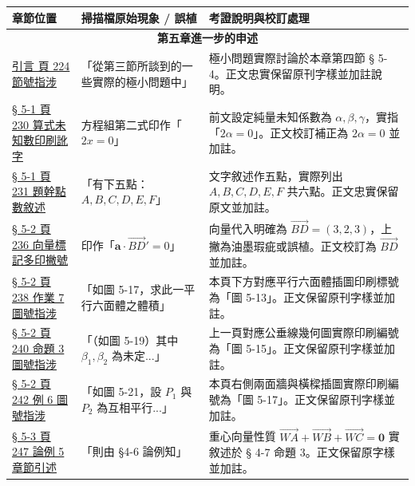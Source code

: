 \documentclass[a4paper,12pt,twoside]{article}
\begin{document}
\begin{table}[H]
\centering
\small
\renewcommand{\arraystretch}{1.35}
\begin{tabularx}{\textwidth}{|p{3.2cm}|p{3.8cm}|X|}
\hline
\textbf{章節位置} & \textbf{掃描檔原始現象 / 誤植} & \textbf{考證說明與校訂處理} \\ \hline

\multicolumn{3}{|c|}{\textbf{第五章\quad 進一步的申述}} \\ \hline

\hyperref[note:b3s-ch5-p224-sec-ref]{引言 頁 224 節號指涉} & 
「從第三節所談到的一些實際的極小問題中」 & 
極小問題實際討論於本章第四節 § 5-4。正文忠實保留原刊字樣並加註說明。 \\ \hline

\hyperref[note:b3s-ch5-p230-2alpha-typo]{§ 5-1 頁 230 算式未知數印刷訛字} & 
方程組第二式印作「$2x = 0$」 & 
前文設定純量未知係數為 $\alpha, \beta, \gamma$，實指「$2\alpha = 0$」。正文校訂補正為 $2\alpha = 0$ 並加註。 \\ \hline

\hyperref[note:b3s-ch5-p231-ex3-points]{§ 5-1 頁 231 題幹點數敘述} & 
「有下五點：$A, B, C, D, E, F$」 & 
文字敘述作五點，實際列出 $A, B, C, D, E, F$ 共六點。正文忠實保留原文並加註。 \\ \hline

\hyperref[note:b3s-ch5-p236-bd-prime]{§ 5-2 頁 236 向量標記多印撇號} & 
印作「$\mathbf{a} \cdot \vec{BD}' = 0$」 & 
向量代入明確為 $\vec{BD} = (3, 2, 3)$，上撇為油墨瑕疵或誤植。正文校訂為 $\vec{BD}$ 並加註。 \\ \hline

\hyperref[note:b3s-ch5-p238-fig-ref]{§ 5-2 頁 238 作業 7 圖號指涉} & 
「如圖 5-17，求此一平行六面體之體積」 & 
本頁下方對應平行六面體插圖印刷標號為「圖 5-13」。正文保留原刊字樣並加註。 \\ \hline

\hyperref[note:b3s-ch5-p240-fig-ref]{§ 5-2 頁 240 命題 3 圖號指涉} & 
「（如圖 5-19）其中 $\beta_1, \beta_2$ 為未定...」 & 
上一頁對應公垂線幾何圖實際印刷編號為「圖 5-15」。正文保留原刊字樣並加註。 \\ \hline

\hyperref[note:b3s-ch5-p242-fig-ref]{§ 5-2 頁 242 例 6 圖號指涉} & 
「如圖 5-21，設 $P_1$ 與 $P_2$ 為互相平行...」 & 
本頁右側兩面牆與橫樑插圖實際印刷編號為「圖 5-17」。正文保留原刊字樣並加註。 \\ \hline

\hyperref[note:b3s-ch5-p247-sec-ref]{§ 5-3 頁 247 論例 5 章節引述} & 
「則由 §4-6 論例知」 & 
重心向量性質 $\vec{WA} + \vec{WB} + \vec{WC} = \mathbf{0}$ 實敘述於 § 4-7 命題 3。正文保留原字樣並加註。 \\ \hline


\end{tabularx}
\end{table}
\end{document}
